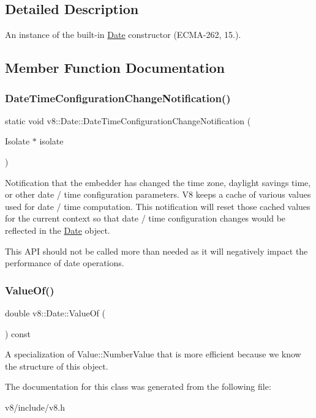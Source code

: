 \subsection{Detailed Description}
An instance of the built-\/in \mbox{\hyperlink{classv8_1_1Date}{Date}} constructor (E\+C\+M\+A-\/262, 15.). 

\subsection{Member Function Documentation}
\mbox{\label{classv8_1_1Date_adb084ec0683d3d195ad0f78af5f6f72b}} 
\subsubsection{\texorpdfstring{Date\+Time\+Configuration\+Change\+Notification()}{DateTimeConfigurationChangeNotification()}}
{\footnotesize\ttfamily static void v8\+::\+Date\+::\+Date\+Time\+Configuration\+Change\+Notification (\begin{DoxyParamCaption}\item[{Isolate $\ast$}]{isolate }\end{DoxyParamCaption})\hspace{0.3cm}{\ttfamily [static]}}

Notification that the embedder has changed the time zone, daylight savings time, or other date / time configuration parameters. V8 keeps a cache of various values used for date / time computation. This notification will reset those cached values for the current context so that date / time configuration changes would be reflected in the \mbox{\hyperlink{classv8_1_1Date}{Date}} object.

This A\+PI should not be called more than needed as it will negatively impact the performance of date operations. \mbox{\label{classv8_1_1Date_adb9d292549a173e045ee177051dbde19}} 
\subsubsection{\texorpdfstring{Value\+Of()}{ValueOf()}}
{\footnotesize\ttfamily double v8\+::\+Date\+::\+Value\+Of (\begin{DoxyParamCaption}{ }\end{DoxyParamCaption}) const}

A specialization of Value\+::\+Number\+Value that is more efficient because we know the structure of this object. 

The documentation for this class was generated from the following file\+:\begin{DoxyCompactItemize}
\item 
v8/include/v8.\+h\end{DoxyCompactItemize}

